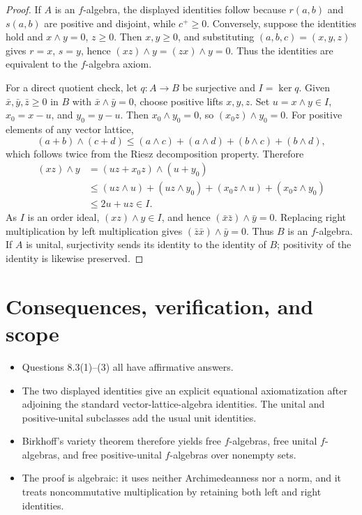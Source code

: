 \documentclass[11pt]{article}
\newcommand{\meet}{\mathbin{\wedge}}
\begin{document}
\begin{proof}
If \(A\) is an \(f\)-algebra, the displayed identities follow because
\(r(a,b)\) and \(s(a,b)\) are positive and disjoint, while \(c^+\geq0\).
Conversely, suppose the identities hold and \(x\meet y=0\), \(z\geq0\).
Then \(x,y\geq0\), and substituting \((a,b,c)=(x,y,z)\) gives
\(r=x\), \(s=y\), hence \((xz)\meet y=(zx)\meet y=0\).  Thus the identities
are equivalent to the \(f\)-algebra axiom.

For a direct quotient check, let \(q:A\to B\) be surjective and
\(I=\ker q\).  Given \(\bar x,\bar y,\bar z\geq0\) in \(B\) with
\(\bar x\meet\bar y=0\), choose positive lifts \(x,y,z\).  Set
\(u=x\meet y\in I\), \(x_0=x-u\), and \(y_0=y-u\).  Then
\(x_0\meet y_0=0\), so \((x_0z)\meet y_0=0\).  For positive elements of
any vector lattice,
\[
 (a+b)\meet(c+d)
 \leq(a\meet c)+(a\meet d)+(b\meet c)+(b\meet d),
\]
which follows twice from the Riesz decomposition property.  Therefore
\begin{align*}
 (xz)\meet y
 &= (uz+x_0z)\meet(u+y_0)\\
 &\leq (uz\meet u)+(uz\meet y_0)+(x_0z\meet u)
       +(x_0z\meet y_0)\\
 &\leq 2u+uz\in I.
\end{align*}
As \(I\) is an order ideal, \((xz)\meet y\in I\), and hence
\((\bar x\bar z)\meet\bar y=0\).  Replacing right multiplication by left
multiplication gives \((\bar z\bar x)\meet\bar y=0\).  Thus \(B\) is an
\(f\)-algebra.  If \(A\) is unital, surjectivity sends its identity to the
identity of \(B\); positivity of the identity is likewise preserved.
\end{proof}

\clearpage
\section*{Consequences, verification, and scope}
\begin{itemize}
\item Questions 8.3(1)--(3) all have affirmative answers.
\item The two displayed identities give an explicit equational
axiomatization after adjoining the standard vector-lattice-algebra identities.
The unital and positive-unital subclasses add the usual unit identities.
\item Birkhoff's variety theorem therefore yields free \(f\)-algebras, free
unital \(f\)-algebras, and free positive-unital \(f\)-algebras over nonempty
sets.
\item The proof is algebraic: it uses neither Archimedeanness nor a norm, and
it treats noncommutative multiplication by retaining both left and right
identities.
\end{itemize}
\end{document}
